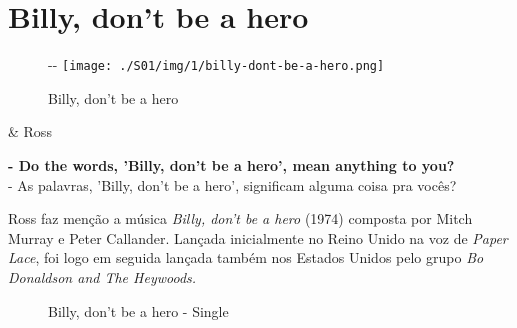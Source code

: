 \hypertarget{billy-dont-be-a-hero}{%
\section{Billy, don't be a hero}\label{billy-dont-be-a-hero}}

\begin{figure}[!ht]
  \begin{adjustwidth}{-\oddsidemargin-1in}{-\rightmargin}
    \centering
    \texttt{[image: ./S01/img/1/billy-dont-be-a-hero.png]}
    \caption{Billy, don’t be a hero\label{fig:billy-don-t-be-a-hero}}
  \end{adjustwidth}
\end{figure}

\begin{tcolorbox}[enhanced,center upper,
    drop fuzzy shadow southeast, boxrule=0.3pt,
    lower separated=false,
    colframe=black!30!dialogoBorder,colback=white]
\begin{minipage}[c]{0.14\linewidth}
   & \centering \scriptsize{Ross}
\end{minipage}
\hspace{.1mm}
\begin{minipage}[c]{0.8\linewidth}
  \textbf{- Do the words, 'Billy, don't be a hero', mean anything to you?}\\
  - As palavras, 'Billy, don't be a hero', significam alguma coisa pra vocês?
\end{minipage}
\end{tcolorbox}

Ross faz menção a música \emph{Billy, don't be a hero} (1974) composta
por Mitch Murray e Peter Callander. Lançada inicialmente no Reino Unido
na voz de \emph{Paper Lace}, foi logo em seguida lançada também nos
Estados Unidos pelo grupo \emph{Bo Donaldson and The Heywoods.}

\begin{figure}
  \centering
    \caption{Billy, don’t be a hero - Single\label{fig:billy-don-t-be-a-hero-single}}
\end{figure}

